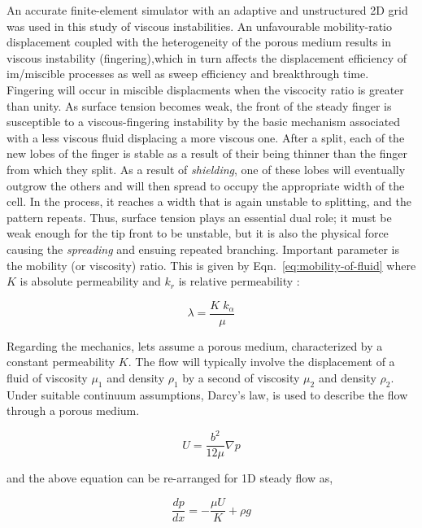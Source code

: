\documentclass[preprint,authoryear,12pt]{elsarticle}
\begin{document}
An accurate finite-element simulator with an adaptive and unstructured 2D grid was used in this study of viscous instabilities. An unfavourable mobility-ratio displacement coupled with the heterogeneity of the porous medium results in viscous instability (fingering),which in turn affects the displacement efficiency of im/miscible processes as well as sweep efficiency and breakthrough time. 
Fingering will occur in miscible displacments when the viscocity ratio is greater than unity. As surface tension becomes weak, the front of the steady finger is susceptible to a viscous-fingering instability by the basic mechanism associated with a less viscous fluid displacing a more viscous one. After a split, each of the new lobes of the finger is stable as a result of their being thinner than the finger from which they split. As a result of \textit{shielding}, one of these lobes will eventually outgrow the others and will then spread to occupy the appropriate width of the cell. In the process, it reaches a width that is again unstable to splitting, and the pattern repeats. Thus, surface tension plays an essential dual role; it must be weak enough for the tip front to be unstable, but it is also the physical force causing the \textit{spreading} and ensuing repeated branching. Important parameter is the mobility (or viscosity) ratio. This is given by Eqn.~\ref{eq:mobility-of-fluid} where $K$ is absolute permeability and $k_{r}$ is relative permeability :

\begin{equation}
\lambda = \frac{K\;k_{\alpha}}{\mu}
\label{eq:mobility-of-fluid}
\end{equation}

\noindent Regarding the mechanics, lets assume a porous medium, characterized by a constant permeability $K$. The flow will typically involve the displacement of a fluid of viscosity $\mu_1$  and density $\rho_1$ by a second of viscosity $\mu_2$ and density $\rho_2$. Under suitable continuum assumptions, Darcy's law, is used to describe the flow through a porous medium.

\begin{equation}
 U = \frac{b^2}{12 \mu} \nabla p
\end{equation}

and the above equation can be re-arranged for 1D steady flow as,

\begin{equation}
 \frac{dp}{dx}= - \frac{\mu U}{K} + \rho g 
\end{equation}
\end{document}
